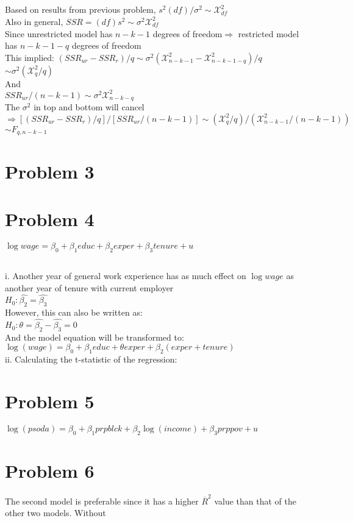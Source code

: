 \documentclass[11pt, oneside]{article}   	%
\begin{document}
\subsection{}
Based on results from previous problem, $s^2(df)/\sigma^2\sim\mathcal{X}_{df}^2$\\
Also in general, $SSR=(df)s^2\sim\sigma^2\mathcal{X}_{df}^2$\\
Since unrestricted model has $n-k-1$ degrees of freedom$\Rightarrow$ restricted model has $n-k-1-q$ degrees of freedom\\
This implied:
\indent $(SSR_{ur}-SSR_r)/q\sim\sigma^2(\mathcal{X}_{n-k-1}^2-\mathcal{X}_{n-k-1-q}^2)/q$\\
\indent\indent$\sim\sigma^2(\mathcal{X}_q^2/q)$\\
\indent And\\
\indent$SSR_{ur}/(n-k-1)\sim\sigma^2\mathcal{X}^2_{n-k-q}$\\
\indent The $\sigma^2$ in top and bottom will cancel\\
\indent$\Rightarrow[(SSR_{ur}-SSR_r)/q]/[SSR_{ur}/(n-k-1)]\sim(\mathcal{X}_q^2/q)/(\mathcal{X}_{n-k-1}^2/(n-k-1))$\\
\indent$\sim F_{q,n-k-1}$\\

\section{Problem 3}


\section{Problem 4}
$\log{wage}=\beta_0+\beta_1educ+\beta_2exper+\beta_3tenure+u$\\
\subsection{}
i. Another year of general work experience has as much effect on $\log{wage}$ as another year of tenure with current employer\\
\indent$H_0: \hat{\beta_2}=\hat{\beta_3}$\\
\indent However, this can also be written as:\\
\indent$H_0: \theta=\hat{\beta_2}-\hat{\beta_3}=0$\\
\indent And the model equation will be transformed to:\\
\indent$\log(wage)=\beta_0+\beta_1educ+\theta exper+\beta_2(exper+tenure)$\\
ii. Calculating the t-statistic of the regression: \\


\section{Problem 5}
$\log(psoda)=\beta_0+\beta_1prpblck+\beta_2\log(income)+\beta_3prppov+u$\\







\section{Problem 6}
The second model is preferable since it has a higher $\overline{R}^2$ value than that of the other two models. Without
\end{document}
